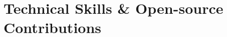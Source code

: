 \section{Technical Skills \& Open-source Contributions}
  \resumeSubHeadingListStart
  \resumeSubHeadingListEnd

